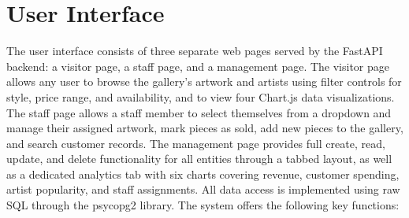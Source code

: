 \documentclass[12pt]{article}
\begin{document}
\newpage

\section*{User Interface}

The user interface consists of three separate web pages served by the FastAPI backend: a visitor page, a staff page, and a management page. The visitor page allows any user to browse the gallery's artwork and artists using filter controls for style, price range, and availability, and to view four Chart.js data visualizations. The staff page allows a staff member to select themselves from a dropdown and manage their assigned artwork, mark pieces as sold, add new pieces to the gallery, and search customer records. The management page provides full create, read, update, and delete functionality for all entities through a tabbed layout, as well as a dedicated analytics tab with six charts covering revenue, customer spending, artist popularity, and staff assignments. All data access is implemented using raw SQL through the psycopg2 library. The system offers the following key functions:
\end{document}
